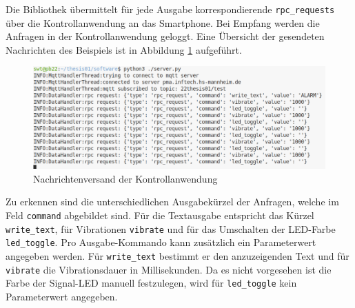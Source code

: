 \documentclass[11pt,a4paper]{report}
\begin{document}
Die Bibliothek übermittelt für jede Ausgabe korrespondierende \texttt{rpc\_requests} über die Kontrollanwendung an das Smartphone.
Bei Empfang werden die Anfragen in der Kontrollanwendung geloggt.
Eine Übersicht der gesendeten Nachrichten des Beispiels ist in Abbildung \ref{fig:req_controll_app} aufgeführt.
\begin{figure}[htbp]
  \centering
  \includegraphics[width=\textwidth]{images/server_requests}
  \caption{Nachrichtenversand der Kontrollanwendung}
  \label{fig:req_controll_app}
\end{figure}
Zu erkennen sind die unterschiedlichen Ausgabekürzel der Anfragen, welche im Feld \texttt{command} abgebildet sind.
Für die Textausgabe entspricht das Kürzel \texttt{write\_text}, für Vibrationen \texttt{vibrate} und für das Umschalten der LED-Farbe \texttt{led\_toggle}.
Pro Ausgabe-Kommando kann zusätzlich ein Parameterwert angegeben werden.
Für \texttt{write\_text} bestimmt er den anzuzeigenden Text und für \texttt{vibrate} die Vibrationsdauer in Millisekunden.
Da es nicht vorgesehen ist die Farbe der Signal-LED manuell festzulegen, wird für \texttt{led\_toggle} kein Parameterwert angegeben.
\end{document}
